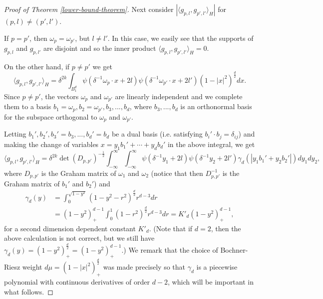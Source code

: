 \begin{proof}[Proof of Theorem \ref{lower-bound-theorem}]
 Next consider $|\langle g_{p,l}, g_{p',l'}\rangle_H|$ for $(p,l)\neq (p',l')$. 
 
 If $p=p'$, then $\omega_p = \omega_{p'}$, but $l\neq l'$. In this case, we easily see that the supports of $g_{p,l}$ and $g_{p,l'}$ are disjoint and so the inner product $\langle g_{p,l}, g_{p',l'}\rangle_H = 0$. 
 
 On the other hand, if $p\neq p'$ we get
 \begin{equation}
  \langle g_{p,l}, g_{p',l'}\rangle_{H} = \delta^{2k}\int_{B_1^d} \psi(\delta^{-1}\omega_p\cdot x + 2l)\psi(\delta^{-1}\omega_{p'}\cdot x + 2l')(1-|x|^2)^{\frac{d}{2}}dx.
 \end{equation}
 Since $p\neq p'$, the vectors $\omega_p$ and $\omega_{p'}$ are linearly independent and we complete them to a basis $b_1 = \omega_p, b_2 = \omega_{p'}, b_3,...,b_d$, where $b_3,...,b_d$ is an orthonormal basis for the subspace orthogonal to $\omega_p$ and $\omega_{p'}$. 
 
 Letting $b_1',b_2',b_3'=b_3,...,b_d'=b_d$ be a dual basis (i.e. satisfying $b_i'\cdot b_j = \delta_{ij}$) and making the change of variables $x = y_1b_1' + \cdots + y_db_d'$ in the above integral, we get
 \begin{equation}\label{inner-product-equation}
  \langle g_{p,l}, g_{p',l'}\rangle_{H} = \delta^{2k}\det(D_{p,p'})^{-\frac{1}{2}} \int_{-\infty}^\infty \int_{-\infty}^\infty \psi(\delta^{-1}y_1+2l)\psi(\delta^{-1}y_2+2l') \gamma_d(|y_1b_1' + y_2b_2'|) dy_1dy_2,
 \end{equation}
 where $D_{p,p'}$ is the Graham matrix of $\omega_1$ and $\omega_2$ (notice that then $D_{p,p'}^{-1}$ is the Graham matrix of $b_1'$ and $b_2'$) and
\begin{equation}
 \begin{split}
  \gamma_d(y) &= \int_0^{\sqrt{1-y^2}} (1-y^2-r^2)^{\frac{d}{2}}r^{d-3}dr\\ 
  &= (1-y^2)_+^{d-1}\int_0^{1} (1-r^2)^{\frac{d}{2}}r^{d-3}dr = K'_d(1-y^2)_+^{d-1},
  \end{split}
 \end{equation}
 for a second dimension dependent constant $K'_d$. (Note that if $d=2$, then the above calculation is not correct, but we still have $\gamma_d(y) =  (1-y^2)_+^{\frac{d}{2}} = (1-y^2)_+^{d-1}$.) We remark that the choice of Bochner-Riesz weight $d\mu = (1 - |x|^2)_+^{\frac{d}{2}}$ was made precisely so that $\gamma_d$ is a piecewise polynomial with continuous derivatives of order $d-2$, which will be important in what follows.
 

\end{proof}
